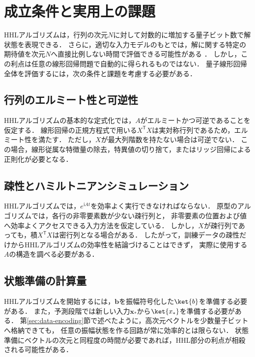 \section{成立条件と実用上の課題}
\label{sec:hhl-assumptions-and-limitations}

HHLアルゴリズムは，行列の次元$N$に対して対数的に増加する量子ビット数で解状態を表現できる．
さらに，適切な入力モデルのもとでは，解に関する特定の期待値を次元$N$へ直接比例しない時間で評価できる可能性がある
\cite{hhl2009}．
しかし，この利点は任意の線形回帰問題で自動的に得られるものではない．
量子線形回帰全体を評価するには，次の条件と課題を考慮する必要がある．

\subsection{行列のエルミート性と可逆性}
\label{subsec:hermiticity-and-invertibility}

HHLアルゴリズムの基本的な定式化では，$A$がエルミートかつ可逆であることを仮定する．
線形回帰の正規方程式で用いる$X^{\mathsf{T}}X$は実対称行列であるため，エルミート性を満たす．
ただし，$X$が最大列階数を持たない場合は可逆でない．
この場合，線形従属な特徴量の除去，特異値の切り捨て，またはリッジ回帰による正則化が必要となる．

\subsection{疎性とハミルトニアンシミュレーション}
\label{subsec:sparsity-and-hamiltonian-simulation}

HHLアルゴリズムでは，$e^{\mathrm{i}At}$を効率よく実行できなければならない．
原型のアルゴリズムでは，各行の非零要素数が少ない疎行列と，
非零要素の位置および値へ効率よくアクセスできる入力方法を仮定している\cite{hhl2009}．
しかし，$X$が疎行列であっても，積$X^{\mathsf{T}}X$は密行列となる場合がある．
したがって，訓練データの疎性だけからHHLアルゴリズムの効率性を結論づけることはできず，
実際に使用する$A$の構造を調べる必要がある．

\subsection{状態準備の計算量}
\label{subsec:state-preparation-cost}

HHLアルゴリズムを開始するには，$\bm{b}$を振幅符号化した$\ket{b}$を準備する必要がある．
また，予測段階では新しい入力$\bm{x}_{*}$から$\ket{x_{*}}$を準備する必要がある．
第\ref{sec:data-encoding}節で述べたように，高次元ベクトルを少数量子ビットへ格納できても，
任意の振幅状態を作る回路が常に効率的とは限らない．
状態準備にベクトルの次元と同程度の時間が必要であれば，HHL部分の利点が相殺される可能性がある．

